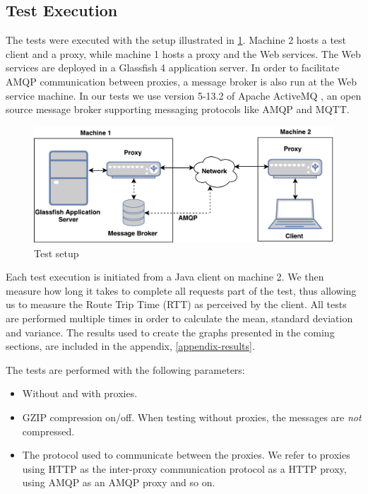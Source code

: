 \subsection{Test Execution}

The tests were executed with the setup illustrated in
\cref{figure-testing-setup}. Machine 2 hosts a test client and a proxy, while
machine 1 hosts a proxy and the Web services. The Web services are deployed in a
Glassfish 4 application server. In order to facilitate AMQP communication
between proxies, a message broker is also run at the Web service machine. In our
tests we use version 5-13.2 of Apache ActiveMQ \cite{activemq-homepage}, an
open source message broker supporting messaging protocols like AMQP and MQTT.

\begin{figure}[h]
\includegraphics[width=\textwidth]{images/testing_setup.pdf}
\caption{Test setup}
\label{figure-testing-setup}
\end{figure}

Each test execution is initiated from a Java client on machine 2. We then
measure how long it takes to complete all requests part of the test, thus
allowing us to measure the Route Trip Time (RTT) as perceived by the client. All
tests are performed multiple times in order to calculate the mean, standard
deviation and variance. The results used to create the graphs presented in the
coming sections, are included in the appendix, \cref{appendix-results}.

The tests are performed with the following parameters:

\begin{itemize}

    \item Without and with proxies.

    \item GZIP compression on/off. When testing without proxies, the messages
    are \textit{not} compressed.

    \item The protocol used to communicate between the proxies. We refer to
    proxies using HTTP as the inter-proxy communication protocol as a HTTP
    proxy, using AMQP as an AMQP proxy and so on.

\end{itemize}



